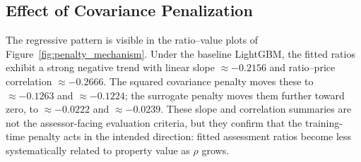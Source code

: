 \documentclass{article}
\theoremstyle{plain}
\theoremstyle{definition}
\newcommand{\1}{\mathbf{1}}
\begin{document}
\subsection{Effect of Covariance Penalization}


The regressive pattern is visible in the ratio--value plots of Figure~\ref{fig:penalty_mechanism}. Under the baseline LightGBM, the fitted ratios exhibit a strong negative trend with linear slope $\approx -0.2156$ and ratio--price correlation $\approx -0.2666$. The squared covariance penalty moves these to $\approx -0.1263$ and $\approx -0.1224$; the surrogate penalty moves them further toward zero, to $\approx -0.0222$ and $\approx -0.0239$. These slope and correlation summaries are not the assessor-facing evaluation criteria, but they confirm that the training-time penalty acts in the intended direction: fitted assessment ratios become less systematically related to property value as $\rho$ grows.


\end{document}
